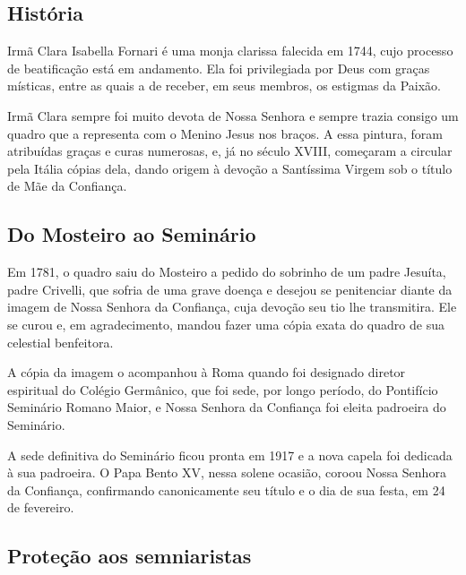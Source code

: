 \documentclass[18pt]{article}
\begin{document}
\begin{justify}

 \begin{center}
  \section{História}\label{sec:História} %
 \end{center}

Irmã Clara Isabella Fornari é uma monja clarissa falecida em 1744, cujo processo de beatificação está em andamento. Ela foi privilegiada por Deus com graças místicas, entre as quais a de receber, em seus membros, os estigmas da Paixão.

Irmã Clara sempre foi muito devota de Nossa Senhora e sempre trazia consigo um quadro que a representa com o Menino Jesus nos braços. A essa pintura, foram atribuídas graças e curas numerosas, e, já no século XVIII, começaram a circular pela Itália cópias dela, dando origem à devoção a Santíssima Virgem sob o título de Mãe da Confiança.


\begin{justify}
 \subsection{Do Mosteiro ao Seminário}
\end{justify}

Em 1781, o quadro saiu do Mosteiro a pedido do sobrinho de um padre Jesuíta, padre Crivelli, que sofria de uma grave doença e desejou se penitenciar diante da imagem de Nossa Senhora da Confiança, cuja devoção seu tio lhe transmitira. Ele se curou e, em agradecimento, mandou fazer uma cópia exata do quadro de sua celestial benfeitora.

A cópia da imagem o acompanhou à Roma quando foi designado diretor espiritual do Colégio Germânico, que foi sede, por longo período, do Pontifício Seminário Romano Maior, e Nossa Senhora da Confiança foi eleita padroeira do Seminário.

A sede definitiva do Seminário ficou pronta em 1917 e a nova capela foi dedicada à sua padroeira. O Papa Bento XV, nessa solene ocasião, coroou Nossa Senhora da Confiança, confirmando canonicamente seu título e o dia de sua festa, em 24 de fevereiro.


\begin{justify}
 \subsection{Proteção aos semniaristas}


\end{justify}
\end{justify}
\end{document}
